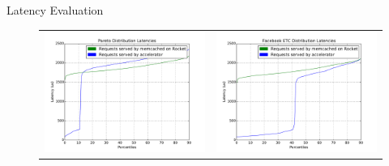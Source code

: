 \begin{block}{Latency Evaluation}
\begin{figure}
\begin{tabular}{cc}
  \includegraphics[width=\linewidth/2]{../img/pareto.pdf} &   \hspace{-10mm}  \includegraphics[width=\linewidth/2]{../img/etc.pdf} \\
\end{tabular}
\end{figure}
\vspace{-10mm}
\end{block}
